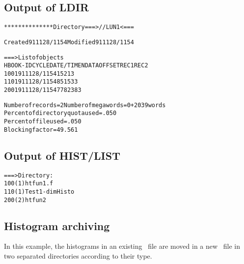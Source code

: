 \begin{center}
\subsection*{Output of LDIR}
\begin{alltt}
 ************** Directory ===> //LUN1 <===

                  Created 911128/1154  Modified 911128/1154


 ===> List of objects
     HBOOK-ID  CYCLE   DATE/TIME   NDATA   OFFSET    REC1    REC2
        100       1   911128/1154    152       1       3
        110       1   911128/1154     85     153       3
        200       1   911128/1154    778     238       3

  Number of records =    2  Number of megawords =  0 +  2039 words
  Per cent of directory quota used =    .050
  Per cent of file used            =    .050
  Blocking factor                  =  49.561
\end{alltt}
\subsection*{Output of HIST/LIST}
\begin{alltt}
 ===> Directory :
        100 (1)   htfun1.f
        110 (1)   Test 1-dim Histo
        200 (2)   htfun2
\end{alltt}
\end{center}
\clearpage
\mbox{}

\clearpage

\subsection{Histogram archiving}

In this example, the histograms in an existing \HBOOK\ file are moved
in a new \HBOOK\ file in two separated directories according to their type.

